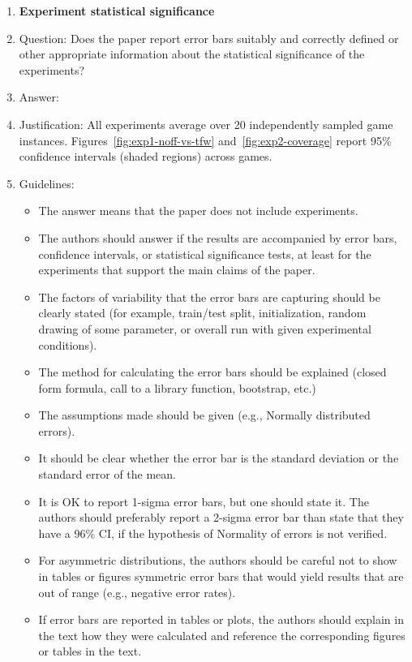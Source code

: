 \documentclass{article}
\begin{document}
\begin{enumerate}
\item {\bf Experiment statistical significance}
    \item[] Question: Does the paper report error bars suitably and correctly defined or other appropriate information about the statistical significance of the experiments?
    \item[] Answer: \answerYes{}
    \item[] Justification: All experiments average over 20 independently sampled game instances. Figures~\ref{fig:exp1-noff-vs-tfw} and~\ref{fig:exp2-coverage} report 95\% confidence intervals (shaded regions) across games.
    \item[] Guidelines:
    \begin{itemize}
        \item The answer \answerNA{} means that the paper does not include experiments.
        \item The authors should answer \answerYes{} if the results are accompanied by error bars, confidence intervals, or statistical significance tests, at least for the experiments that support the main claims of the paper.
        \item The factors of variability that the error bars are capturing should be clearly stated (for example, train/test split, initialization, random drawing of some parameter, or overall run with given experimental conditions).
        \item The method for calculating the error bars should be explained (closed form formula, call to a library function, bootstrap, etc.)
        \item The assumptions made should be given (e.g., Normally distributed errors).
        \item It should be clear whether the error bar is the standard deviation or the standard error of the mean.
        \item It is OK to report 1-sigma error bars, but one should state it. The authors should preferably report a 2-sigma error bar than state that they have a 96\% CI, if the hypothesis of Normality of errors is not verified.
        \item For asymmetric distributions, the authors should be careful not to show in tables or figures symmetric error bars that would yield results that are out of range (e.g., negative error rates).
        \item If error bars are reported in tables or plots, the authors should explain in the text how they were calculated and reference the corresponding figures or tables in the text.
    \end{itemize}


\end{enumerate}
\end{document}
